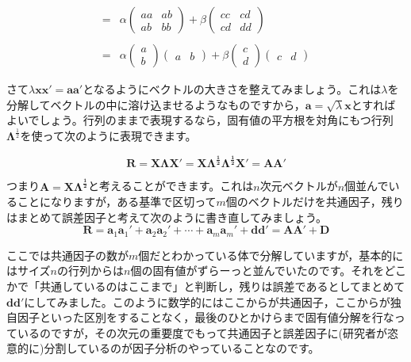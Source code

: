 \documentclass{ltjsbook}
\begin{document}
\[\begin{array}{ll}
		= & \alpha \begin{pmatrix} aa & ab\\ ab & bb \end{pmatrix} +
		\beta \begin{pmatrix}cc & cd \\ cd & dd \end{pmatrix}                                                                                      \\
		  &                                                                                                                                        \\
		= & \alpha \begin{pmatrix}a\\b\end{pmatrix}\begin{pmatrix}a &b\end{pmatrix} +
		\beta \begin{pmatrix} c\\d \end{pmatrix}\begin{pmatrix}c&d\end{pmatrix}
	\end{array}
\]

さて$\lambda \bm{xx'} = \bm{aa'}$となるようにベクトルの大きさを整えてみましょう。これは$\lambda$を分解してベクトルの中に溶け込ませるようなものですから，$\bm{a} = \sqrt{\lambda}\bm{x}$とすればよいでしょう。行列のままで表現するなら，固有値の平方根を対角にもつ行列$\bm{\Lambda}^{\frac{1}{2}}$を使って次のように表現できます。

\[
	\bm{R} = \bm{X\Lambda X}' = \bm{X \Lambda^{\frac{1}{2}}\Lambda^{\frac{1}{2}} X}' =
	\bm{AA}'
\]

つまり$\bm{A}=\bm{X\Lambda^{\frac{1}{2}}}$と考えることができます。これは$n$次元ベクトルが$n$個並んでいることになりますが，ある基準で区切って$m$個のベクトルだけを共通因子，残りはまとめて誤差因子と考えて次のように書き直してみましょう。
\begin{equation}
	\bm{R}=\bm{a}_1\bm{a}_1'+\bm{a}_2\bm{a}_2'+\cdots +\bm{a}_m\bm{a}_m'+\bm{d} \bm{d}' =\bm{AA}'+\bm{D}
\end{equation}

ここでは共通因子の数が$m$個だとわかっている体で分解していますが，基本的にはサイズ$n$の行列からは$n$個の固有値がずらーっと並んでいたのです。それをどこかで「共通しているのはここまで」と判断し，残りは誤差であるとしてまとめて$\bm{dd'}$にしてみました。このように数学的にはここからが共通因子，ここからが独自因子といった区別をすることなく，最後のひとかけらまで固有値分解を行なっているのですが，その次元の重要度でもって共通因子と誤差因子に(研究者が恣意的に)分割しているのが因子分析のやっていることなのです。
\end{document}
